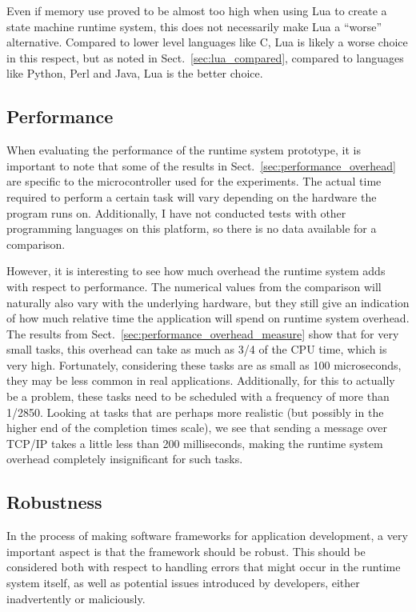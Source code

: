 \noindent
Even if memory use proved to be almost too high when using Lua to create a state machine runtime system, this does not necessarily make Lua a ``worse'' alternative. Compared to lower level languages like C, Lua is likely a worse choice in this respect, but as noted in Sect.~\ref{sec:lua_compared}, compared to languages like Python, Perl and Java, Lua is the better choice. 

\subsection{Performance}
\label{sec:disq_performance}
When evaluating the performance of the runtime system prototype, it is important to note that some of the results in Sect.~\ref{sec:performance_overhead} are specific to the microcontroller used for the experiments. The actual time required to perform a certain task will vary depending on the hardware the program runs on. Additionally, I have not conducted tests with other programming languages on this platform, so there is no data available for a comparison.

\noindent
However, it is interesting to see how much overhead the runtime system adds with respect to performance. The numerical values from the comparison will naturally also vary with the underlying hardware, but they still give an indication of how much relative time the application will spend on runtime system overhead. The results from Sect.~\ref{sec:performance_overhead_measure} show that for very small tasks, this overhead can take as much as 3/4 of the CPU time, which is very high. Fortunately, considering these tasks are as small as 100 microseconds, they may be less common in real applications. Additionally, for this to actually be a problem, these tasks need to be scheduled with a frequency of more than 1/2850. Looking at tasks that are perhaps more realistic (but possibly in the higher end of the completion times scale), we see that sending a message over TCP/IP takes a little less than 200 milliseconds, making the runtime system overhead completely insignificant for such tasks.

\subsection{Robustness}
\label{sec:disq_robustness}
In the process of making software frameworks for application development, a very important aspect is that the framework should be robust. This should be considered both with respect to handling errors that might occur in the runtime system itself, as well as potential issues introduced by developers, either inadvertently or maliciously.

